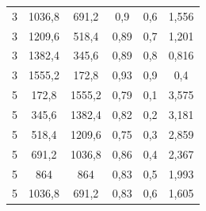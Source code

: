 \begin{table}[H]
\begin{tabular}{|c|c|c|c|c|c|}
					3          & 1036,8                                                                         & 691,2                                                                 & 0,9                & 0,6            & 1,556             \\
					3          & 1209,6                                                                         & 518,4                                                                 & 0,89               & 0,7            & 1,201             \\
					3          & 1382,4                                                                         & 345,6                                                                 & 0,89               & 0,8            & 0,816             \\
					3          & 1555,2                                                                         & 172,8                                                                 & 0,93               & 0,9            & 0,4               \\
					5          & 172,8                                                                          & 1555,2                                                                & 0,79               & 0,1            & 3,575             \\
					5          & 345,6                                                                          & 1382,4                                                                & 0,82               & 0,2            & 3,181             \\
					5          & 518,4                                                                          & 1209,6                                                                & 0,75               & 0,3            & 2,859             \\
					5          & 691,2                                                                          & 1036,8                                                                & 0,86               & 0,4            & 2,367             \\
					5          & 864                                                                            & 864                                                                   & 0,83               & 0,5            & 1,993             \\
					5          & 1036,8                                                                         & 691,2                                                                 & 0,83               & 0,6            & 1,605             \\

\end{tabular}
\end{table}
